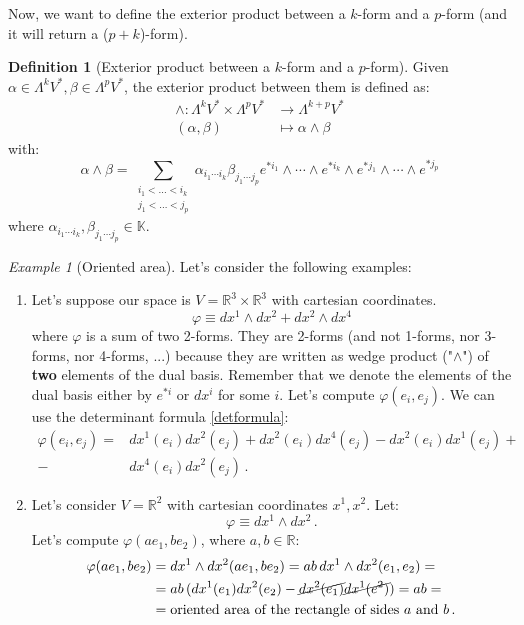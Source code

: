 \documentclass[a4paper,11pt,titlepage, article, oneside]{memoir}
\numberwithin{equation}{section}
\theoremstyle{definition}
\newtheorem{definition}[theorem]{Definition}
\theoremstyle{remark}
\newtheorem{example}[theorem]{Example}
\newcommand{\rfield}{\mathbb{R}}
\begin{document}
Now, we want to define the exterior product between a $k$-form and a $p$-form (and it will return a ($p+k$)-form).

\begin{definition}[Exterior product between a $k$-form and a $p$-form]
  Given $\alpha \in \Lambda ^k V^*, \beta \in \Lambda^p V^*$, the exterior product between them is defined as:
  \begin{align}
    \wedge \colon \Lambda ^k V^* \times \Lambda ^p V^* &\rightarrow \Lambda^{k+p} V^* \nonumber \\
    (\alpha, \beta) &\mapsto \alpha \wedge \beta \nonumber
  \end{align}
  with:
  $$\alpha \wedge \beta = \sum\limits_{\substack{i_1 < \ldots < i_k \\ j_1 < \ldots < j_p}} \alpha_{i_1 \cdots i_k}\beta_{j_1 \cdots j_p} e^{*i_1} \wedge \cdots \wedge e^{*i_k} \wedge e^{*j_1} \wedge \cdots \wedge e^{*j_p} $$
  where $\alpha_{i_1 \cdots i_k},\beta_{j_1 \cdots j_p} \in \mathbb{K}$.
\end{definition}


\begin{tcolorbox}\begin{example}[Oriented area] \label{orarea}
  Let's consider the following examples:
  \begin{enumerate}
    \item Let's suppose our space is $V = \rfield^3 \times \rfield^3$ with cartesian coordinates.
    $$\varphi \equiv dx^1 \wedge dx^2 + dx^2 \wedge dx^4$$
    where $\varphi$ is a sum of two 2-forms. They are 2-forms (and not 1-forms, nor 3-forms, nor 4-forms, ...) because they are written as wedge product ("$\wedge$") of \textbf{two} elements of the dual basis. Remember that we denote the elements of the dual basis either by $e^{*i}$ or $dx^i$ for some $i$.
    Let's compute $\varphi(e_i, e_j)$. We can use the determinant formula \eqref{detformula}: 
\begin{align*}
    \varphi(e_i, e_j) = &dx^1(e_i) dx^2(e_j) + dx^2(e_i)dx^4(e_j) - dx^2(e_i)dx^1(e_j) + \\ - &dx^4(e_i)dx^2(e_j)\, .
    \end{align*}
    \item Let's consider $V = \rfield^2$ with cartesian coordinates $x^1, x^2$. Let:
    $$\varphi \equiv dx^1 \wedge dx^2\, .$$
    Let's compute $\varphi(ae_1, be_2)$, where $ a,b \in \rfield$:
    \begin{align*}
    \varphi(ae_1, be_2) &= dx^1 \wedge dx^2(ae_1, be_2) = ab\,  dx^1 \wedge dx^2(e_1, e_2) = \\
    &= ab \, (dx^1(e_1)dx^2(e_2) - \cancel{dx^2(e_1)} \cancel{dx^1(e^2)}) = ab = \\
    &= \text{oriented area of the rectangle of sides } a \text{ and } b\, .
  \end{align*}
  \end{enumerate}

\end{example}\end{tcolorbox}
\end{document}
